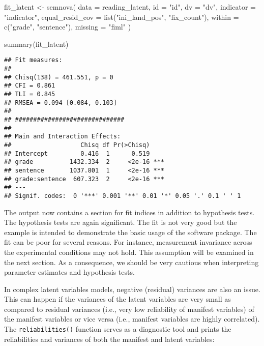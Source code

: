 \documentclass[
]{book}
\newenvironment{Shaded}{\begin{snugshade}}{\end{snugshade}}
\newcommand{\AttributeTok}[1]{\textcolor[rgb]{0.77,0.63,0.00}{#1}}
\newcommand{\FunctionTok}[1]{\textcolor[rgb]{0.00,0.00,0.00}{#1}}
\newcommand{\NormalTok}[1]{#1}
\newcommand{\OtherTok}[1]{\textcolor[rgb]{0.56,0.35,0.01}{#1}}
\newcommand{\StringTok}[1]{\textcolor[rgb]{0.31,0.60,0.02}{#1}}
\begin{document}
\begin{Shaded}
\begin{Highlighting}[]
\NormalTok{fit\_latent }\OtherTok{\textless{}{-}} \FunctionTok{semnova}\NormalTok{(}
    \AttributeTok{data =}\NormalTok{ reading\_latent,}
    \AttributeTok{id =} \StringTok{"id"}\NormalTok{, }
    \AttributeTok{dv =} \StringTok{"dv"}\NormalTok{,}
    \AttributeTok{indicator =} \StringTok{"indicator"}\NormalTok{,}
    \AttributeTok{equal\_resid\_cov =} \FunctionTok{list}\NormalTok{(}\StringTok{"ini\_land\_pos"}\NormalTok{, }\StringTok{"fix\_count"}\NormalTok{),}
    \AttributeTok{within =} \FunctionTok{c}\NormalTok{(}\StringTok{"grade"}\NormalTok{, }\StringTok{"sentence"}\NormalTok{),}
    \AttributeTok{missing =} \StringTok{"fiml"}
\NormalTok{)}

\FunctionTok{summary}\NormalTok{(fit\_latent)}
\end{Highlighting}
\end{Shaded}

\begin{verbatim}
## Fit measures:
## 
## Chisq(138) = 461.551, p = 0
## CFI = 0.861
## TLI = 0.845
## RMSEA = 0.094 [0.084, 0.103]
## 
## ##############################
## 
## Main and Interaction Effects:
##                   Chisq df Pr(>Chisq)    
## Intercept         0.416  1      0.519    
## grade          1432.334  2     <2e-16 ***
## sentence       1037.801  1     <2e-16 ***
## grade:sentence  607.323  2     <2e-16 ***
## ---
## Signif. codes:  0 '***' 0.001 '**' 0.01 '*' 0.05 '.' 0.1 ' ' 1
\end{verbatim}

The output now contains a section for fit indices in addition to hypothesis tests. The hypothesis tests are again significant. The fit is not very good but the example is intended to demonstrate the basic usage of the software package. The fit can be poor for several reasons. For instance, measurement invariance across the experimental conditions may not hold. This assumption will be examined in the next section. As a consequence, we should be very cautious when interpreting parameter estimates and hypothesis tests.

In complex latent variables models, negative (residual) variances are also an issue. This can happen if the variances of the latent variables are very small as compared to residual variances (i.e., very low reliability of manifest variables) of the manifest variables or vice versa (i.e., manifest variables are highly correlated). The \texttt{reliabilities()} function serves as a diagnostic tool and prints the reliabilities and variances of both the manifest and latent variables:
\end{document}
